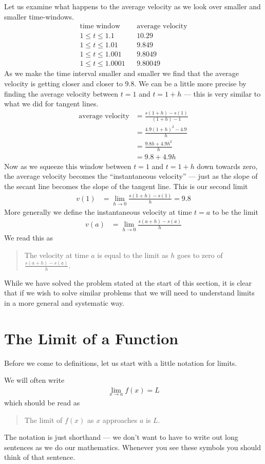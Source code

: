 Let us examine what happens to the average velocity as we look over smaller and
smaller time-windows.
\begin{align*}
  \text{time window} && \text{average velocity}\\
  1 \leq t \leq 1.1 && 10.29 \\
  1 \leq t \leq 1.01 && 9.849 \\
  1 \leq t \leq 1.001 && 9.8049 \\
  1 \leq t \leq 1.0001 && 9.80049
\end{align*}
As we make the time interval smaller and smaller we find that the average
velocity is getting closer and closer to $9.8$. We can be a little more precise
by finding the average velocity between $t=1$ and $t=1+h$ --- this is very
similar to what we did for tangent lines.
\begin{align*}
  \text{average velocity} &= \frac{s(1+h) - s(1)}{(1+h)-1} \\
  &= \frac{4.9(1+h)^2 - 4.9}{h} \\
  &= \frac{9.8h + 4.9h^2}{h} \\
  &= 9.8 + 4.9h
\end{align*}
Now as we squeeze this window between $t=1$ and $t=1+h$ down towards zero, the
average velocity becomes the ``instantaneous velocity'' --- just as the
slope of the secant line becomes the slope of the tangent line. This is
our second limit
\begin{align*}
 v(1) &= \lim_{h \to 0} \frac{s(1+h)-s(1)}{h} = 9.8
\end{align*}
More generally we define the instantaneous velocity at time $t=a$ to be the
limit
\begin{align*}
  v(a) &= \lim_{h \to 0} \frac{ s(a+h) - s(a) }{h}
\end{align*}
We read this as
\begin{quote}
 The velocity at time $a$ is equal to the limit as $h$ goes to zero of
$\frac{s(a+h)-s(a)}{h}$.
\end{quote}

While we have solved the problem stated at the start of this section, it is
clear that if we wish to solve similar problems that we will need to
understand limits in a more general and systematic way.

\section{The Limit of a Function}
\label{sec lim func}

Before we come to definitions, let us start with a little notation for limits.
\begin{notn}\label{ntn_1_3_1}
We will often write
\begin{align*}
  \lim_{x \to a} f(x) = L
\end{align*}
which should be read as
\begin{quote}
The limit of $f(x)$ as $x$ approaches $a$ is $L$.
\end{quote}
\end{notn}
The notation is just shorthand --- we don't want to have to write out long
sentences as we do our mathematics. Whenever you see these symbols you
should think of that sentence.

